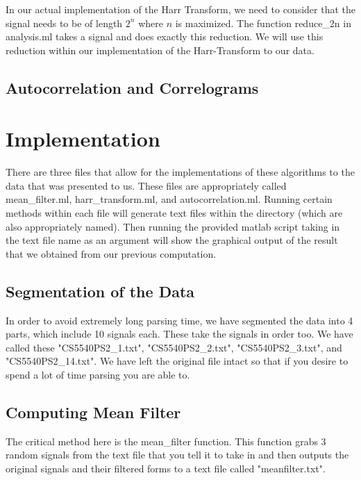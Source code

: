 \documentclass[11pt]{article} %
\begin{document}
In our actual implementation of the Harr Transform, we need to consider that the signal needs to be of length $2^n$ where $n$ is maximized. The function reduce\_2n in analysis.ml takes a signal and does exactly this reduction. We will use this reduction within our implementation of the Harr-Transform to our data. 

\subsection{Autocorrelation and Correlograms}


\section{Implementation}
There are three files that allow for the implementations of these algorithms to the data that was presented to us. These files are appropriately called mean\_filter.ml, harr\_transform.ml, and autocorrelation.ml. Running certain methods within each file will generate text files within the directory (which are also appropriately named). Then running the provided matlab script taking in the text file name as an argument will show the graphical output of the result that we obtained from our previous computation. 


\subsection{Segmentation of the Data}
In order to avoid extremely long parsing time, we have segmented the data into 4 parts, which include 10 signals each. These take the signals in order too. We have called these "CS5540PS2\_1.txt", "CS5540PS2\_2.txt", "CS5540PS2\_3.txt",  and "CS5540PS2\_14.txt". We have left the original file intact so that if you desire to spend a lot of time parsing you are able to. 

\subsection{Computing Mean Filter}
The critical method here is the mean\_filter function. This function grabs 3 random signals from the text file that you tell it to take in and then outputs the original signals and their filtered forms to a text file called "meanfilter.txt". 
\end{document}

